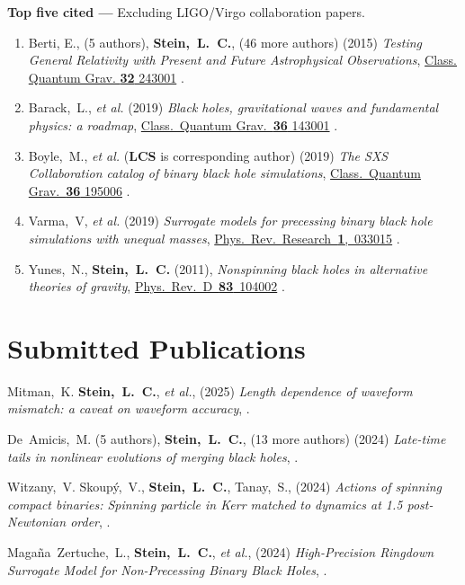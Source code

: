 {\bf Top five cited ---}%
Excluding LIGO/Virgo collaboration papers.
\begin{enumerate}
\item
  Berti, E., (5 authors), {\bf Stein,~L.~C.}, (46 more authors)
  (2015)
  {\it Testing General Relativity with Present and Future
    Astrophysical Observations},
  \href{http://dx.doi.org/10.1088/0264-9381/32/24/243001}{Class. Quantum Grav. {\bf 32} 243001}
  .
\item
  Barack,~L., {\it et al.}
  (2019)
  {\it Black holes, gravitational waves and fundamental physics: a roadmap},
  \href{https://doi.org/10.1088/1361-6382/ab0587}{Class.~Quantum Grav.~{\bf 36} 143001}
  .
\item
  Boyle,~M., {\it et al.} ({\bf LCS} is corresponding author)
  (2019)
  {\it The SXS Collaboration catalog of binary black hole simulations},
  \href{https://doi.org/10.1088/1361-6382/ab34e2}{Class.~Quantum Grav.~{\bf 36} 195006}
  .
\item
  Varma,~V, {\it et al.}
  (2019)
  {\it Surrogate models for precessing binary black hole simulations with
  unequal masses},
  \href{https://doi.org/10.1103/PhysRevResearch.1.033015}{Phys.~Rev.~Research~{\bf 1},~033015}
  .
\item
  Yunes,~N., {\bf Stein,~L.~C.}
  (2011),
  {\it Nonspinning black holes in alternative theories of gravity},
  \href{http://dx.doi.org/10.1103/PhysRevD.83.104002}{Phys.~Rev.~D~{\bf 83}~104002}
  .
\end{enumerate}
\else%
\fi

\renewcommand{\citeCount}[1]{}

\section{\sc Submitted Publications}
\begin{etaremune}[start=\value{pubCounter}]
\item
  Mitman,~K.
  {\bf Stein,~L.~C.},
  {\it et al.},
  (2025)
  {\it Length dependence of waveform mismatch: a caveat on waveform accuracy},
  .
  \citeCount{0}
\item
  De~Amicis,~M.
  (5 authors),
  {\bf Stein,~L.~C.},
  (13 more authors)
  (2024)
  {\it Late-time tails in nonlinear evolutions of merging black holes},
  .
  \citeCount{0}
\item
  Witzany,~V.
  Skoupý,~V.,
  {\bf Stein,~L.~C.},
  Tanay,~S.,
  (2024)
  {\it Actions of spinning compact binaries: Spinning particle in Kerr matched to dynamics at 1.5 post-Newtonian order},
  .
  \citeCount{0}
\item
  Magaña~Zertuche,~L.,
  {\bf Stein,~L.~C.},
  {\it et al.},
  (2024)
  {\it High-Precision Ringdown Surrogate Model for Non-Precessing Binary Black Holes},
  .
  \citeCount{0}
  \setcounter{pubCounter}{\value{enumi}}
\end{etaremune}

